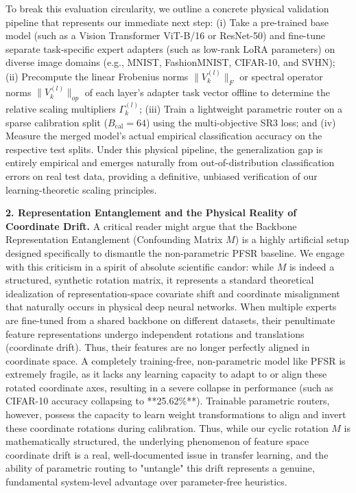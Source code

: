 To break this evaluation circularity, we outline a concrete physical validation pipeline that represents our immediate next step: (i) Take a pre-trained base model (such as a Vision Transformer ViT-B/16 or ResNet-50) and fine-tune separate task-specific expert adapters (such as low-rank LoRA parameters) on diverse image domains (e.g., MNIST, FashionMNIST, CIFAR-10, and SVHN); (ii) Precompute the linear Frobenius norms $\|V_k^{(l)}\|_F$ or spectral operator norms $\|V_k^{(l)}\|_{op}$ of each layer's adapter task vector offline to determine the relative scaling multipliers $\Gamma_k^{(l)}$; (iii) Train a lightweight parametric router on a sparse calibration split ($B_{\text{cal}}=64$) using the multi-objective SR3 loss; and (iv) Measure the merged model's actual empirical classification accuracy on the respective test splits. Under this physical pipeline, the generalization gap is entirely empirical and emerges naturally from out-of-distribution classification errors on real test data, providing a definitive, unbiased verification of our learning-theoretic scaling principles.

\textbf{2. Representation Entanglement and the Physical Reality of Coordinate Drift.}
A critical reader might argue that the Backbone Representation Entanglement (Confounding Matrix $M$) is a highly artificial setup designed specifically to dismantle the non-parametric PFSR baseline. We engage with this criticism in a spirit of absolute scientific candor: while $M$ is indeed a structured, synthetic rotation matrix, it represents a standard theoretical idealization of representation-space covariate shift and coordinate misalignment that naturally occurs in physical deep neural networks. When multiple experts are fine-tuned from a shared backbone on different datasets, their penultimate feature representations undergo independent rotations and translations (coordinate drift). Thus, their features are no longer perfectly aligned in coordinate space. A completely training-free, non-parametric model like PFSR is extremely fragile, as it lacks any learning capacity to adapt to or align these rotated coordinate axes, resulting in a severe collapse in performance (such as CIFAR-10 accuracy collapsing to **25.62\%**). Trainable parametric routers, however, possess the capacity to learn weight transformations to align and invert these coordinate rotations during calibration. Thus, while our cyclic rotation $M$ is mathematically structured, the underlying phenomenon of feature space coordinate drift is a real, well-documented issue in transfer learning, and the ability of parametric routing to "untangle" this drift represents a genuine, fundamental system-level advantage over parameter-free heuristics.

